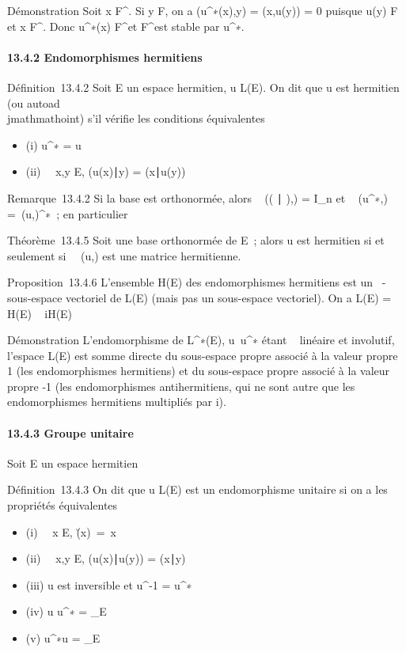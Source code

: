 \documentclass[]{article}
\begin{document}
Démonstration Soit x \in F^\bot. Si y \in F, on a
\phi(u^∗(x),y) = \phi(x,u(y)) = 0 puisque u(y) \in F et x \in
F^\bot. Donc u^∗(x) \in F^\bot et
F^\bot est stable par u^∗.

\paragraph{13.4.2 Endomorphismes hermitiens}

Définition~13.4.2 Soit E un espace hermitien, u \in L(E). On dit que u est
hermitien (ou autoad\\jmathmathoint) s'il vérifie les conditions équivalentes

\begin{itemize}
\itemsep1pt\parskip0pt
\item
  (i) u^∗ = u
\item
  (ii) \forall~~x,y \in E,
  (u(x)∣y) =
  (x∣u(y))
\end{itemize}

Remarque~13.4.2 Si la base  est orthonormée, alors
\mathrmMat~ ((
∣ ),) = I_n et
\mathrmMat~
(u^∗,) =\
\mathrmMat (u,)^∗~; en particulier

Théorème~13.4.5 Soit  une base orthonormée de E~; alors u est hermitien
si et seulement
si~\mathrmMat~ (u,) est une
matrice hermitienne.

Proposition~13.4.6 L'ensemble H(E) des endomorphismes hermitiens est un
\mathbb{R}~-sous-espace vectoriel de L(E) (mais pas un \mathbb{C} sous-espace vectoriel).
On a L(E) = H(E) \oplus~ iH(E)

Démonstration L'endomorphisme de L^∗(E),
u\mapsto~u^∗ étant ~ linéaire et
involutif, l'espace L(E) est somme directe du sous-espace propre associé
à la valeur propre 1 (les endomorphismes hermitiens) et du sous-espace
propre associé à la valeur propre -1 (les endomorphismes antihermitiens,
qui ne sont autre que les endomorphismes hermitiens multipliés par i).

\paragraph{13.4.3 Groupe unitaire}

Soit E un espace hermitien

Définition~13.4.3 On dit que u \in L(E) est un endomorphisme unitaire si
on a les propriétés équivalentes

\begin{itemize}
\itemsep1pt\parskip0pt
\item
  (i) \forall~~x \in E,
  \u(x)\
  =\ x\
\item
  (ii) \forall~~x,y \in E,
  (u(x)∣u(y)) =
  (x∣y)
\item
  (iii) u est inversible et u^-1 = u^∗
\item
  (iv) u \cdot u^∗ = \mathrmId_E
\item
  (v) u^∗\cdot u = \mathrmId_E
\end{itemize}
\end{document}
